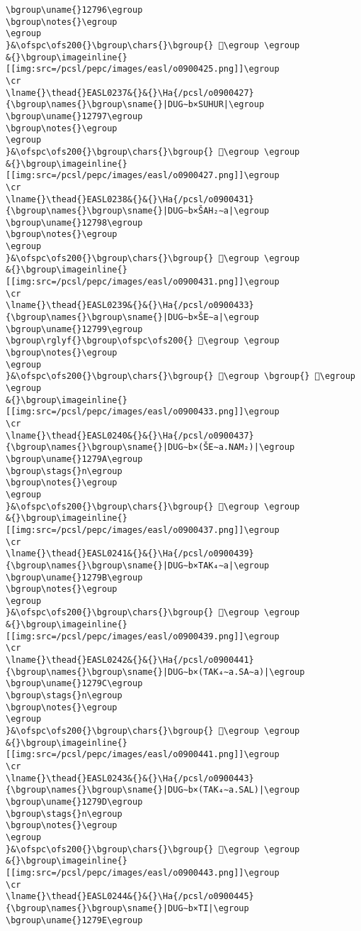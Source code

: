 \begin{verbatim}
\bgroup\uname{}12796\egroup
\bgroup\notes{}\egroup
\egroup
}&\ofspc\ofs200{}\bgroup\chars{}\bgroup{} 𒞖\egroup \egroup
&{}\bgroup\imageinline{}[[img:src=/pcsl/pepc/images/easl/o0900425.png]]\egroup
\cr
\lname{}\thead{}EASL0237&{}&{}\Ha{/pcsl/o0900427}{\bgroup\names{}\bgroup\sname{}|DUG∼b×SUHUR|\egroup
\bgroup\uname{}12797\egroup
\bgroup\notes{}\egroup
\egroup
}&\ofspc\ofs200{}\bgroup\chars{}\bgroup{} 𒞗\egroup \egroup
&{}\bgroup\imageinline{}[[img:src=/pcsl/pepc/images/easl/o0900427.png]]\egroup
\cr
\lname{}\thead{}EASL0238&{}&{}\Ha{/pcsl/o0900431}{\bgroup\names{}\bgroup\sname{}|DUG∼b×ŠAH₂∼a|\egroup
\bgroup\uname{}12798\egroup
\bgroup\notes{}\egroup
\egroup
}&\ofspc\ofs200{}\bgroup\chars{}\bgroup{} 𒞘\egroup \egroup
&{}\bgroup\imageinline{}[[img:src=/pcsl/pepc/images/easl/o0900431.png]]\egroup
\cr
\lname{}\thead{}EASL0239&{}&{}\Ha{/pcsl/o0900433}{\bgroup\names{}\bgroup\sname{}|DUG∼b×ŠE∼a|\egroup
\bgroup\uname{}12799\egroup
\bgroup\rglyf{}\bgroup\ofspc\ofs200{} 𒞙\egroup \egroup
\bgroup\notes{}\egroup
\egroup
}&\ofspc\ofs200{}\bgroup\chars{}\bgroup{} 𒞴\egroup \bgroup{} 𒞙\egroup \egroup
&{}\bgroup\imageinline{}[[img:src=/pcsl/pepc/images/easl/o0900433.png]]\egroup
\cr
\lname{}\thead{}EASL0240&{}&{}\Ha{/pcsl/o0900437}{\bgroup\names{}\bgroup\sname{}|DUG∼b×(ŠE∼a.NAM₂)|\egroup
\bgroup\uname{}1279A\egroup
\bgroup\stags{}n\egroup
\bgroup\notes{}\egroup
\egroup
}&\ofspc\ofs200{}\bgroup\chars{}\bgroup{} 𒞚\egroup \egroup
&{}\bgroup\imageinline{}[[img:src=/pcsl/pepc/images/easl/o0900437.png]]\egroup
\cr
\lname{}\thead{}EASL0241&{}&{}\Ha{/pcsl/o0900439}{\bgroup\names{}\bgroup\sname{}|DUG∼b×TAK₄∼a|\egroup
\bgroup\uname{}1279B\egroup
\bgroup\notes{}\egroup
\egroup
}&\ofspc\ofs200{}\bgroup\chars{}\bgroup{} 𒞛\egroup \egroup
&{}\bgroup\imageinline{}[[img:src=/pcsl/pepc/images/easl/o0900439.png]]\egroup
\cr
\lname{}\thead{}EASL0242&{}&{}\Ha{/pcsl/o0900441}{\bgroup\names{}\bgroup\sname{}|DUG∼b×(TAK₄∼a.SA∼a)|\egroup
\bgroup\uname{}1279C\egroup
\bgroup\stags{}n\egroup
\bgroup\notes{}\egroup
\egroup
}&\ofspc\ofs200{}\bgroup\chars{}\bgroup{} 𒞜\egroup \egroup
&{}\bgroup\imageinline{}[[img:src=/pcsl/pepc/images/easl/o0900441.png]]\egroup
\cr
\lname{}\thead{}EASL0243&{}&{}\Ha{/pcsl/o0900443}{\bgroup\names{}\bgroup\sname{}|DUG∼b×(TAK₄∼a.SAL)|\egroup
\bgroup\uname{}1279D\egroup
\bgroup\stags{}n\egroup
\bgroup\notes{}\egroup
\egroup
}&\ofspc\ofs200{}\bgroup\chars{}\bgroup{} 𒞝\egroup \egroup
&{}\bgroup\imageinline{}[[img:src=/pcsl/pepc/images/easl/o0900443.png]]\egroup
\cr
\lname{}\thead{}EASL0244&{}&{}\Ha{/pcsl/o0900445}{\bgroup\names{}\bgroup\sname{}|DUG∼b×TI|\egroup
\bgroup\uname{}1279E\egroup

\end{verbatim}
